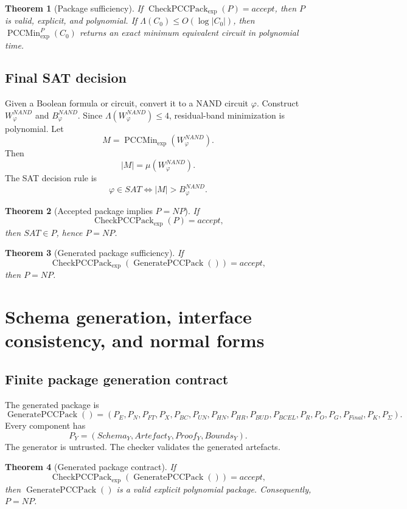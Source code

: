 \documentclass[10.5pt,a4paper]{article}
\newtheorem{theorem}{Theorem}[section]
\newcommand{\PCCMin}{\operatorname{PCCMin}_{\exp}}
\newcommand{\CheckPack}{\operatorname{CheckPCCPack}_{\exp}}
\newcommand{\GenPack}{\operatorname{GeneratePCCPack}}
\begin{document}
\begin{theorem}[Package sufficiency]
If \(\CheckPack(P)=accept\), then \(P\) is valid, explicit, and polynomial. If \(\Lambda(C_0)\le O(\log|C_0|)\), then \(\PCCMin^P(C_0)\) returns an exact minimum equivalent circuit in polynomial time.
\end{theorem}

\subsection{Final SAT decision}
Given a Boolean formula or circuit, convert it to a NAND circuit \(\varphi\). Construct \(W^{NAND}_\varphi\) and \(B^{NAND}_\varphi\). Since \(\Lambda(W^{NAND}_\varphi)\le4\), residual-band minimization is polynomial. Let
\[
M=\PCCMin(W^{NAND}_\varphi).
\]
Then
\[
|M|=\mu(W^{NAND}_\varphi).
\]
The SAT decision rule is
\[
\boxed{\varphi\in SAT\Longleftrightarrow |M|>B^{NAND}_\varphi.}
\]

\begin{theorem}[Accepted package implies \(P=NP\)]
If
\[
\CheckPack(P)=accept,
\]
then \(SAT\in P\), hence \(P=NP\).
\end{theorem}

\begin{theorem}[Generated package sufficiency]
If
\[
\CheckPack(\GenPack())=accept,
\]
then \(P=NP\).
\end{theorem}

\section{Schema generation, interface consistency, and normal forms}

\subsection{Finite package generation contract}
The generated package is
\[
\GenPack()=(P_E,P_N,P_{FT},P_X,P_{BC},P_{UN},P_{HN},P_{HR},P_{BUD},P_{BCEL},P_R,P_O,P_G,P_{Final},P_K,P_\Sigma).
\]
Every component has
\[
P_Y=(Schema_Y,Artefact_Y,Proof_Y,Bounds_Y).
\]
The generator is untrusted. The checker validates the generated artefacts.

\begin{theorem}[Generated package contract]
If
\[
\CheckPack(\GenPack())=accept,
\]
then \(\GenPack()\) is a valid explicit polynomial package. Consequently, \(P=NP\).
\end{theorem}
\end{document}
